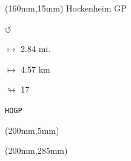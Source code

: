 \begin{textblock*}{40mm}(160mm,15mm)%
Hockenheim GP
\par \Huge$\circlearrowleft$
\Large
\par$\mapsto$ 2.84 mi.
\par$\mapsto$ 4.57 km
\par$\looparrowright$ 17
\par\hfill\tiny\tt HOGP\\
\end{textblock*}
\begin{textblock*}{20mm}(200mm,5mm)%
\fbox{\thepage}
\end{textblock*}
\begin{textblock*}{20mm}(200mm,285mm)%
\fbox{\thepage}
\end{textblock*}
\null\newpage

